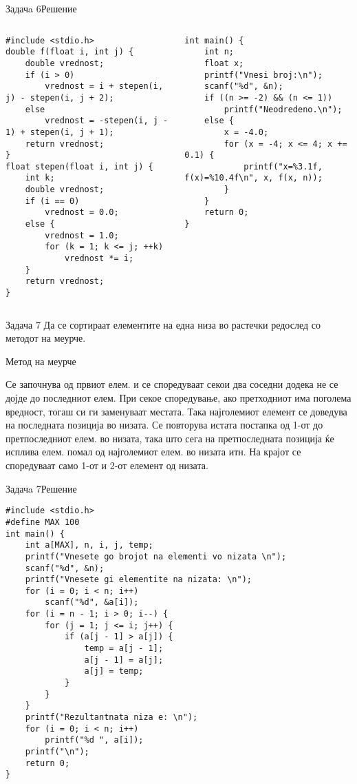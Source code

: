 \begin{frame}[fragile]{Задачa 6}{Решение}
\begin{columns}
    \begin{lstlisting}
#include <stdio.h>
double f(float i, int j) {
    double vrednost;
    if (i > 0)
        vrednost = i + stepen(i, j) - stepen(i, j + 2);
    else
        vrednost = -stepen(i, j - 1) + stepen(i, j + 1);
    return vrednost;
}
float stepen(float i, int j) {
    int k;
    double vrednost;
    if (i == 0)
        vrednost = 0.0;
    else {
        vrednost = 1.0;
        for (k = 1; k <= j; ++k)
            vrednost *= i;
    }
    return vrednost;
}
\end{lstlisting}
\begin{lstlisting}
int main() {
    int n;
    float x;
    printf("Vnesi broj:\n");
    scanf("%d", &n);
    if ((n >= -2) && (n <= 1))
        printf("Neodredeno.\n");
    else {
        x = -4.0;
        for (x = -4; x <= 4; x += 0.1) {
            printf("x=%3.1f, f(x)=%10.4f\n", x, f(x, n));
        }
    }
    return 0;
}
\end{lstlisting}
\end{columns}
\end{frame}

\begin{frame}{Задача 7}
Да се сортираат елементите на една низа во растечки
редослед со методот на меурче.
\begin{exampleblock}{Метод на меурче}
\begin{scriptsize}
Се започнува од првиот елем. и се споредуваат секои два соседни додека не се
дојде до последниот елем. При секое споредување, ако претходниот има поголема
вредност, тогаш си ги заменуваат местата. Така најголемиот елемент се доведува
на последната позиција во низата. Се повторува истата постапка од 1-от до
претпоследниот елем. во низата, така што сега на претпоследната позиција ќе
исплива елем. помал од најголемиот елем. во низата итн. На крајот се споредуваат
само 1-от и 2-от елемент од низата.
\end{scriptsize}
\end{exampleblock}
\end{frame}

\begin{frame}[fragile]{Задачa 7}{Решение}
\begin{lstlisting}
#include <stdio.h>
#define MAX 100
int main() {
    int a[MAX], n, i, j, temp;
    printf("Vnesete go brojot na elementi vo nizata \n");
    scanf("%d", &n);
    printf("Vnesete gi elementite na nizata: \n");
    for (i = 0; i < n; i++)
        scanf("%d", &a[i]);
    for (i = n - 1; i > 0; i--) {
        for (j = 1; j <= i; j++) {
            if (a[j - 1] > a[j]) {
                temp = a[j - 1];
                a[j - 1] = a[j];
                a[j] = temp;
            }
        }
    }
    printf("Rezultantnata niza e: \n");
    for (i = 0; i < n; i++)
        printf("%d ", a[i]);
    printf("\n");
    return 0;
}
\end{lstlisting}
\end{frame}



